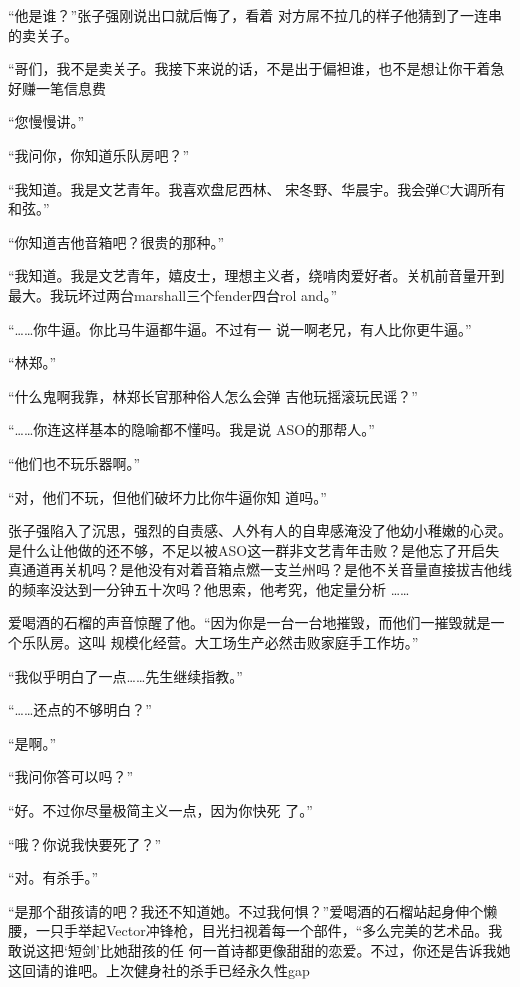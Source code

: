 \documentclass{article}
\begin{document}
“他是谁？”张子强刚说出口就后悔了，看着
对方屌不拉几的样子他猜到了一连串的卖关子。 

“哥们，我不是卖关子。我接下来说的话，不是出于偏袒谁，也不是想让你干着急好赚一笔信息费
\newpage



“您慢慢讲。” 


“我问你，你知道乐队房吧？” 

“我知道。我是文艺青年。我喜欢盘尼西林、
宋冬野、华晨宇。我会弹C大调所有和弦。” 


“你知道吉他音箱吧？很贵的那种。” 

“我知道。我是文艺青年，嬉皮士，理想主义者，绕啃肉爱好者。关机前音量开到最大。我玩坏过两台marshall三个fender四台rol
and。” 

“……你牛逼。你比马牛逼都牛逼。不过有一
说一啊老兄，有人比你更牛逼。” 



“林郑。” 

\newpage

“什么鬼啊我靠，林郑长官那种俗人怎么会弹
吉他玩摇滚玩民谣？” 

“……你连这样基本的隐喻都不懂吗。我是说
ASO的那帮人。” 


“他们也不玩乐器啊。” 

“对，他们不玩，但他们破坏力比你牛逼你知
道吗。” 

张子强陷入了沉思，强烈的自责感、人外有人的自卑感淹没了他幼小稚嫩的心灵。是什么让他做的还不够，不足以被ASO这一群非文艺青年击败？是他忘了开启失真通道再关机吗？是他没有对着音箱点燃一支兰州吗？是他不关音量直接拔吉他线的频率没达到一分钟五十次吗？他思索，他考究，他定量分析
…… 

爱喝酒的石榴的声音惊醒了他。“因为你是一台一台地摧毁，而他们一摧毁就是一个乐队房。这叫
\newpage
规模化经营。大工场生产必然击败家庭手工作坊。”


“我似乎明白了一点……先生继续指教。” 


“……还点的不够明白？” 


“是啊。” 


“我问你答可以吗？” 

“好。不过你尽量极简主义一点，因为你快死
了。” 


“哦？你说我快要死了？” 


“对。有杀手。” 

“是那个甜孩请的吧？我还不知道她。不过我何惧？”爱喝酒的石榴站起身伸个懒腰，一只手举起Vector冲锋枪，目光扫视着每一个部件，“多么完美的艺术品。我敢说这把‘短剑’比她甜孩的任
\newpage
何一首诗都更像甜甜的恋爱。不过，你还是告诉我她这回请的谁吧。上次健身社的杀手已经永久性gap
\end{document}
